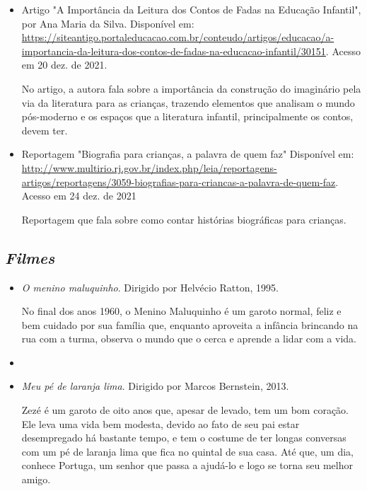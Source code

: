 \documentclass[11pt]{extarticle}
\begin{document}
\begin{itemize}
\item Artigo "A Importância da Leitura dos Contos de Fadas na Educação Infantil", por Ana Maria da Silva. Disponível em: \url{https://siteantigo.portaleducacao.com.br/conteudo/artigos/educacao/a-importancia-da-leitura-dos-contos-de-fadas-na-educacao-infantil/30151}. 
Acesso em 20 dez. de 2021.

No artigo, a autora fala sobre a importância da construção do imaginário pela via da literatura para as crianças, trazendo elementos que analisam o mundo pós-moderno e os espaços que a literatura infantil, principalmente os contos, devem ter.

\item Reportagem "Biografia para crianças, a palavra de quem faz" Disponível em: \url{http://www.multirio.rj.gov.br/index.php/leia/reportagens-artigos/reportagens/3059-biografias-para-criancas-a-palavra-de-quem-faz}. Acesso em 24 dez. de 2021

Reportagem que fala sobre como contar histórias biográficas para crianças.

\end{itemize}

\subsection{\textit{Filmes}}

\begin{itemize}
\item \textit{O menino maluquinho}. Dirigido por Helvécio Ratton, 1995.

No final dos anos 1960, o Menino Maluquinho é um garoto normal, feliz e bem cuidado por sua família que, enquanto aproveita a infância brincando na rua com a turma, observa o mundo que o cerca e aprende a lidar com a vida.

\item \item \textit{Meu pé de laranja lima}. Dirigido por Marcos Bernstein, 2013.

Zezé é um garoto de oito anos que, apesar de levado, tem um bom coração. Ele leva uma vida bem modesta, devido ao fato de seu pai estar desempregado há bastante tempo, e tem o costume de ter longas conversas com um pé de laranja lima que fica no quintal de sua casa. Até que, um dia, conhece Portuga, um senhor que passa a ajudá-lo e logo se torna seu melhor amigo.


\end{itemize}
\end{document}
